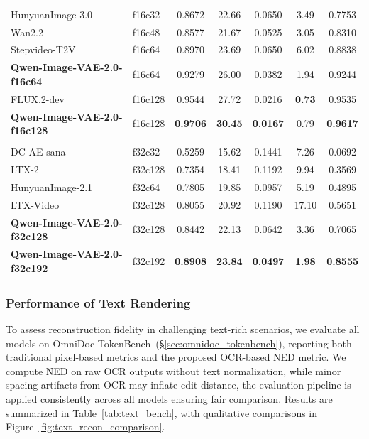\begin{table}[t]
{\begin{tabular}{llccccc}
HunyuanImage-3.0~\citep{hunyuanimage3.0}          & f16c32    & 0.8672 & 22.66 & 0.0650 & 3.49  & 0.7753 \\
Wan2.2~\citep{wan2025wan}                    & f16c48    & 0.8577 & 21.67 & 0.0525 & 3.05  & 0.8310 \\
Stepvideo-T2V~\citep{stepvideo}             & f16c64    & 0.8970 & 23.69 & 0.0650 & 6.02  & 0.8838 \\
\rowcolor{blue!5} \textbf{Qwen-Image-VAE-2.0-f16c64}      & f16c64   & 0.9279 & 26.00 & 0.0382 & 1.94  & 0.9244 \\
FLUX.2-dev~\citep{flux2}                & f16c128   & 0.9544 & 27.72 & 0.0216 & \textbf{0.73}  & 0.9535 \\
\rowcolor{blue!5} \textbf{Qwen-Image-VAE-2.0-f16c128}     & f16c128  & \textbf{0.9706} & \textbf{30.45} & \textbf{0.0167} & 0.79 & \textbf{0.9617} \\
\midrule
\rowcolor{gray!8} \multicolumn{7}{l}{\textit{f32 Compression VAEs}} \\
DC-AE-sana~\citep{dcae}                 & f32c32    & 0.5259 & 15.62 & 0.1441 & 7.26  & 0.0692 \\
LTX-2~\citep{ltx2}                     & f32c128   & 0.7354 & 18.41 & 0.1192 & 9.94  & 0.3569 \\
HunyuanImage-2.1~\citep{hunyuanimage2.1}          & f32c64    & 0.7805 & 19.85 & 0.0957 & 5.19  & 0.4895 \\
LTX-Video~\citep{ltx}                     & f32c128   & 0.8055 & 20.92 & 0.1190 & 17.10 & 0.5651 \\
\rowcolor{blue!5} \textbf{Qwen-Image-VAE-2.0-f32c128}     & f32c128  & 0.8442 & 22.13 & 0.0642 & 3.36  & 0.7065 \\
\rowcolor{blue!5} \textbf{Qwen-Image-VAE-2.0-f32c192}     & f32c192  & \textbf{0.8908} & \textbf{23.84} & \textbf{0.0497} & \textbf{1.98} & \textbf{0.8555} \\
\bottomrule
\end{tabular}
}
\end{table}


\subsubsection{Performance of Text Rendering}
\label{sec:text_rendering}

To assess reconstruction fidelity in challenging text-rich scenarios, we evaluate all models on OmniDoc-TokenBench~(\S\ref{sec:omnidoc_tokenbench}), reporting both traditional pixel-based metrics and the proposed OCR-based NED metric. We compute NED on raw OCR outputs without text normalization, while minor spacing artifacts from OCR may inflate edit distance, the evaluation pipeline is applied consistently across all models ensuring fair comparison. Results are summarized in Table~\ref{tab:text_bench}, with qualitative comparisons in Figure~\ref{fig:text_recon_comparison}.

